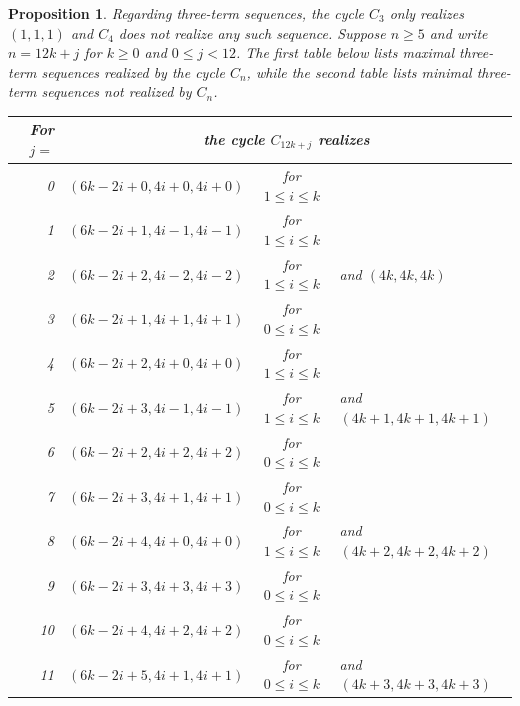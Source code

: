 \documentclass{article}
\newtheorem{proposition}[theorem]{Proposition}
\theoremstyle{definition}
\begin{document}
\begin{proposition}\label{p:mod12}
Regarding three-term sequences, the cycle $C_3$ only realizes $(1,1,1)$ and $C_4$ does not realize any such sequence.
Suppose $n\geq5$ and write $n=12k+j$ for $k\geq0$ and $0\leq j<12$.
The first table below lists maximal three-term sequences realized by the cycle $C_n$,
while the second table lists minimal three-term sequences not realized by $C_n$.

\bigskip

\begin{tabular}{r|lcl}
\hline
For $j=$&\multicolumn{3}{c}{the cycle $C_{12k+j}$ realizes}\\
\hline
0&$(6k-2i+0,4i+0,4i+0)$&for $1\leq i\leq k$&\\
1&$(6k-2i+1,4i-1,4i-1)$&for $1\leq i\leq k$&\\
2&$(6k-2i+2,4i-2,4i-2)$&for $1\leq i\leq k$&and $(4k,4k,4k)$\\
3&$(6k-2i+1,4i+1,4i+1)$&for $0\leq i\leq k$&\\
4&$(6k-2i+2,4i+0,4i+0)$&for $1\leq i\leq k$&\\
5&$(6k-2i+3,4i-1,4i-1)$&for $1\leq i\leq k$&and $(4k+1,4k+1,4k+1)$\\
6&$(6k-2i+2,4i+2,4i+2)$&for $0\leq i\leq k$&\\
7&$(6k-2i+3,4i+1,4i+1)$&for $0\leq i\leq k$&\\
8&$(6k-2i+4,4i+0,4i+0)$&for $1\leq i\leq k$&and $(4k+2,4k+2,4k+2)$\\
9&$(6k-2i+3,4i+3,4i+3)$&for $0\leq i\leq k$&\\
10&$(6k-2i+4,4i+2,4i+2)$&for $0\leq i\leq k$&\\
11&$(6k-2i+5,4i+1,4i+1)$&for $0\leq i\leq k$&and $(4k+3,4k+3,4k+3)$\\
\hline
\end{tabular}

\bigskip


\end{proposition}
\end{document}
